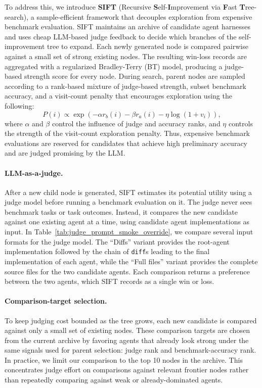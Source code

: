 \documentclass{article}
\begin{document}
To address this, we introduce \textbf{SIFT} (Recursive \textbf{S}elf-\textbf{I}mprovement via \textbf{F}ast \textbf{T}ree-search), a sample-efficient framework that decouples exploration from expensive benchmark evaluation. 
SIFT maintains an archive of candidate agent harnesses and uses cheap LLM-based judge feedback to decide which branches of the self-improvement tree to expand. Each newly generated node is compared pairwise against a small set of strong existing nodes. The resulting win-loss records are aggregated with a regularized Bradley-Terry (BT) model, producing a judge-based strength score for every node. During search, parent nodes are sampled according to a rank-based mixture of judge-based strength, subset benchmark accuracy, and a visit-count penalty that encourages exploration using the following: 
\begin{equation}
\label{eq:prob}
P(i) \propto
\exp\!\left(
-\alpha r_b(i)
-\beta r_a(i)
-\eta \log(1+v_i)
\right),
\end{equation}
where $\alpha$ and $\beta$ control the influence of judge and accuracy ranks, and $\eta$ controls the strength of the visit-count exploration penalty.
Thus, expensive benchmark evaluations are reserved 
for candidates that achieve high preliminary accuracy and are judged promising by the LLM.


\paragraph{LLM-as-a-judge.}
After a new child node is generated, SIFT estimates its potential utility using a judge model before running a benchmark evaluation on it. The judge never sees benchmark tasks or task outcomes. Instead, it compares the new candidate against one existing agent at a time, using candidate agent implementations as input.
In Table~\ref{tab:judge_prompt_smoke_override}, we compare several input formats for the judge model. 
The ``Diffs'' variant provides the root-agent implementation followed by the chain of \texttt{diff}s leading to the final implementation of each agent, while the ``Full files'' variant provides the complete source files for the two candidate agents. 
Each comparison returns a preference between the two agents, which SIFT records as a single win or loss.

\paragraph{Comparison-target selection.}
To keep judging cost bounded as the tree grows, each new candidate is compared against only a small set of existing nodes. These comparison targets are chosen from the current archive by favoring agents that already look strong under the same signals used for parent selection: judge rank and benchmark-accuracy rank. In practice, we limit our comparison to the top 10 nodes in the archive. This concentrates judge effort on comparisons against relevant frontier nodes rather than repeatedly comparing against weak or already-dominated agents.
\end{document}

